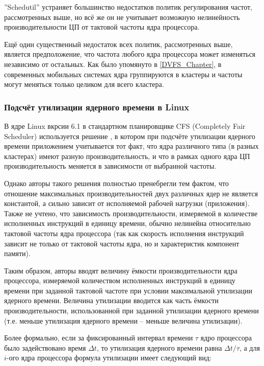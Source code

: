     ''Schedutil'' устраняет большинство недостатков политик регулирования частот, рассмотренных выше,
    но всё же он не учитывает возможную нелинейность производительности ЦП от тактовой частоты ядра
    процессора.

    Ещё один существенный недостаток всех политик, рассмотренных выше, является предположение,
    что частота любого ядра процессора может изменяться независимо от остальных.
    Как было упомянуто в \ref{DVFS_Chapter}, в современных мобильных системах ядра группируются
    в кластеры и частоты могут меняться только целиком для всего кластера.

\subsubsection{Подсчёт утилизации ядерного времени в Linux}

    В ядре Linux вкрсии 6.1 в стандартном планировщике CFS (Completely Fair Scheduler)
    используется решение \cite{KernelDocsCapacity}, в котором при подсчёте утилизации ядерного времени
    приложением учитывается тот факт, что ядра различного типа (в разных кластерах) имеют разную
    производительность, и что в рамках одного ядра ЦП производительность меняется
    в зависимости от выбранной частоты.

    Однако авторы такого решения полностью пренебрегли тем фактом, что отношение максимальных
    производительностей двух различных ядер не является константой, а сильно зависит от
    исполняемой рабочей нагрузки (приложения). Также не учтено, что зависимость производительности,
    измеряемой в количестве исполненных инструкций в единицу времени, обычно нелинейна относительно
    тактовой частоты ядра процессора (так как скорость исполнения инструкций зависит не только от
    тактовой частоты ядра, но и характеристик компонент памяти).

    Таким образом, авторы вводят величину ёмкости производительности ядра процессора,
    измеряемой количеством исполненных инструкций в единицу времени при заданной тактовой частоте
    при условии максимальной утилизации ядерного времени. Величина утилизации вводится как часть
    ёмкости производительности, использованной при заданной утилизации ядерного времени (т.е.
    меньше утилизация ядерного времени -- меньше величина утилизации).

    Более формально, если за фиксированный интервал времени $\tau$ ядро процессора было задействовано время
    $\Delta t$, то утилизация ядерного времени равна $\Delta t / \tau$, а для
    $i$-ого ядра процессора формула утилизации имеет следующий вид:

